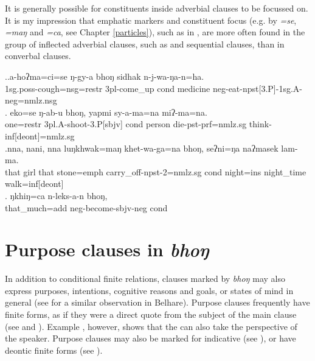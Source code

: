 It is generally possible for constituents inside adverbial clauses to be focussed on. It is my impression that emphatic markers and constituent focus (e.g. by \emph{=se}, \emph{=maŋ} and \emph{=ca}, see Chapter \ref{particles}), such as in \Next, are more often found in the group of inflected adverbial clauses, such as  and sequential clauses, than in converbal clauses.

\ex.\ag.\label{coughcond}a-hoʔma=ci=se ŋ-gy-a bhoŋ sidhak n-j-wa-ŋa-n=ha.\\
{\sc 1sg.poss-}cough{\sc =nsg=restr}  {\sc 3pl-}come\_up {\sc cond} medicine {\sc neg-}eat{\sc -npst[3.P]-1sg.A-neg=nmlz.nsg}\\
\bg. eko=se          ŋ-ab-u                  bhoŋ, yapmi  sy-a-ma=na                       miʔ-ma=na.\\
one{\sc =restr} {\sc 3pl.A-}shoot{\sc -3.P[sbjv]} {\sc cond} person die{\sc -pst-prf=nmlz.sg} think{\sc -inf[deont]=nmlz.sg}\\
 
\bg.nna,  nani,  nna  luŋkhwak=maŋ   khet-wa-ga=na                   bhoŋ, seʔni=ŋa       naʔmasek  lam-ma.\\
that girl that stone{\sc =emph} carry\_off{\sc -npst-2=nmlz.sg} {\sc cond} night{\sc =ins} night\_time walk{\sc =inf[deont]}\\
 
\bg. ŋkhiŋ=ca       n-leks-a-n         bhoŋ, \\
that\_much{\sc =add} {\sc neg-}become{\sc [3]-sbjv-neg} {\sc cond}\\
	
	
	

\section{Purpose clauses in \emph{bhoŋ}}\label{adv-cl-fin-purp}

In addition to conditional finite relations, clauses marked by \emph{bhoŋ} may also express purposes, intentions, cognitive reasons and goals, or states of mind in general (see \citealt{Bickel1993Belhare} for a similar observation in Belhare).  Purpose clauses frequently have  finite forms, as if they were a direct quote from the subject of the main clause (see \Next[a] and  \Next[b]). Example \Next[c], however, shows that the  can also take the perspective of the speaker. Purpose clauses may also be marked for indicative  (see \NNext[a]), or have deontic finite forms (see \NNext[b]). 

